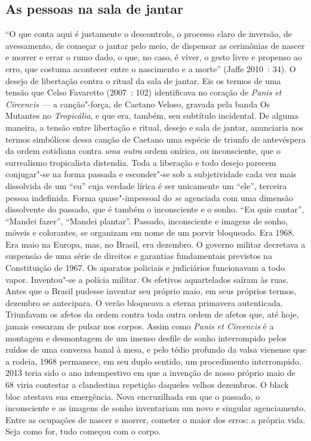 \subsection{As pessoas na sala de jantar}

``O que conta aqui é
justamente o descontrole, o processo claro de inversão, de avessamento,
de começar o jantar pelo meio, de dispensar as cerimônias de nascer e
morrer e errar o rumo dado, o que, no caso, é viver, o gesto livre e
propenso ao erro, que costuma acontecer entre o nascimento e a morte''
(Jaffe 2010~: 34). O desejo de libertação contra o ritual da sala de
jantar. Eis os termos de uma tensão que Celso Favaretto (2007~: 102)
identificava no coração de \emph{Panis et Circencis ---} a canção"-força,
de Caetano Veloso, gravada pela banda Os Mutantes no 
\emph{Tropicália}, e que era, também, seu subtítulo incidental. De
alguma maneira, a tensão entre libertação e ritual, desejo e sala de
jantar, anunciaria nos termos simbólicos dessa canção de Caetano uma
espécie de triunfo de antevéspera da ordem cotidiana contra \emph{uma
outra} ordem onírica, ou inconsciente, que o surrealismo tropicalista
distendia. Toda a liberação e todo desejo parecem conjugar"-se na forma
passada e esconder"-se sob a subjetividade cada vez mais dissolvida de um
``eu'' cuja verdade lírica é ser unicamente um ``ele'', terceira pessoa
indefinida. Forma quase"-impessoal do \emph{se} agenciada com uma
dimensão dissolvente do passado, que é também o inconsciente e o sonho.
``Eu quis cantar'', ``Mandei fazer'', ``Mandei plantar''. Passado,
inconsciente e imagens de sonho, móveis e colorantes, se organizam em
nome de um porvir bloqueado. Era 1968. Era maio na Europa, mas, no
Brasil, era dezembro. O governo militar decretava a suspensão de uma
série de direitos e garantias fundamentais previstos na Constituição de
1967. Os aparatos policiais e judiciários funcionavam a todo vapor.
Inventou"-se a polícia militar. Os efetivos aquartelados saíram às ruas.
Antes que o Brasil pudesse inventar seu próprio maio, em seus próprios
termos, dezembro se antecipara. O verão bloqueava a eterna primavera
autenticada. Triunfavam os afetos da ordem contra toda outra ordem de
afetos que, até hoje, jamais cessaram de pulsar nos corpos. Assim como
\emph{Panis et Circencis} é a montagem e desmontagem de um imenso
desfile de sonho interrompido pelos ruídos de uma conversa banal à mesa,
e pelo tédio profundo da valsa vienense que a rodeia, 1968 permanece, em
seu duplo sentido, um procedimento interrompido. 2013 teria sido o ano
intempestivo em que a invenção de nosso próprio maio de 68 viria
contestar a clandestina repetição daqueles velhos dezembros. O black
bloc atestava sua emergência. Nova encruzilhada em que o passado, o
inconsciente e as imagens de sonho inventariam um novo e singular
agenciamento. Entre as ocupações de nascer e morrer, cometer o maior dos
erros: a própria vida. Seja como for, tudo começou com o corpo.

